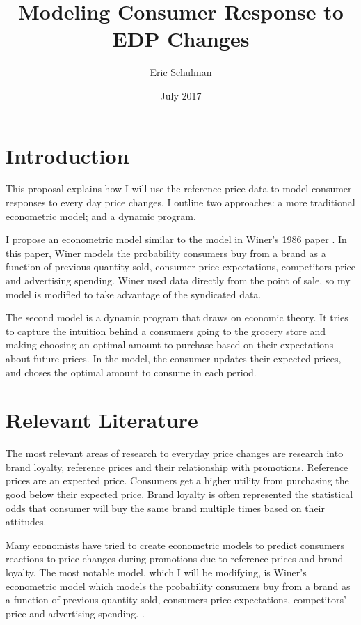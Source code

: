 \documentclass{article}
\title{Modeling Consumer Response to EDP Changes}
\author{Eric Schulman}
\date{July 2017}
\begin{document}
\maketitle

\section{Introduction}


This proposal explains how I will use the reference price data to model consumer responses to every day price changes. I outline two approaches: a more traditional econometric model; and a dynamic program.

I propose an econometric model similar to the model in Winer's 1986 paper \cite{winer}. In this paper, Winer models the probability consumers buy from a brand as a function of previous quantity sold, consumer price expectations, competitors price and advertising spending. Winer used data directly from the point of sale, so my model is modified to take advantage of the syndicated data.

The second model is a dynamic program that draws on economic theory. It tries to capture the intuition behind a consumers going to the grocery store and making choosing an optimal amount to purchase based on their expectations about future prices. In the model, the consumer updates their expected prices, and choses the optimal amount to consume in each period.


\section{Relevant Literature}

The most relevant areas of research to everyday price changes are research into brand loyalty, reference prices and their relationship with promotions. Reference prices are an expected price. Consumers get a higher utility from purchasing the good below their expected price. Brand loyalty is often represented the statistical odds that consumer will buy the same brand multiple times based on their attitudes. 

Many economists have tried to create econometric models to predict consumers reactions to price changes during promotions due to reference prices and brand loyalty. The most notable model, which I will be modifying, is Winer's econometric model which models the probability consumers buy from a brand as a function of previous quantity sold, consumers price expectations, competitors' price and advertising spending.  \cite{winer}.
\end{document}
